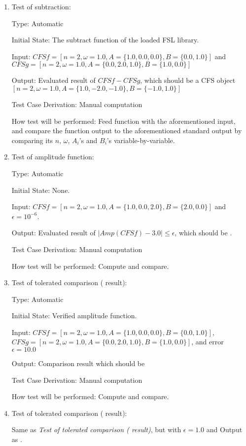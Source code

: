 \documentclass[12pt, titlepage]{article}
\begin{document}
\begin{enumerate}
	
	\item{Test of subtraction: \\}
	
	Type: Automatic
	
	Initial State: The subtract function of the loaded FSL library.
	
	Input: $\mathit{CFSf}=[n=2, \omega=1.0, A=\{1.0, 0.0, 0.0\}, B=\{0.0, 1.0\}]$ and 
	$\mathit{CFSg}=[n=2, \omega=1.0, A=\{0.0, 2.0, 1.0\}, B=\{1.0, 0.0\}]$	 
	
	Output: Evaluated result of $\mathit{CFSf}-\mathit{CFSg}$, which should
        be a CFS object
        $[n=2, \omega=1.0, A=\{1.0, -2.0, -1.0\}, B=\{-1.0, 1.0\}]$
	
	Test Case Derivation: Manual computation
	
	How test will be performed: Feed function with the aforementioned input,
        and compare the function output to the aforementioned standard output by
        comparing its $n$, $\omega$, $A_i$'s and $B_i$'s variable-by-variable.
	
	\item{Test of amplitude function: \\}					
	
	Type: Automatic
	
	Initial State: None.
	
	Input: $\mathit{CFSf}=[n=2, \omega=1.0, A=\{1.0, 0.0, 2.0\}, B=\{2.0, 0.0\}]$ and $\epsilon=10^{-6}$.
	
	Output: Evaluated result of $|\mathit{Amp}(\mathit{CFSf})-3.0|\leq\epsilon$, which should be .
	
	Test Case Derivation: Manual computation
	
	How test will be performed: Compute and compare.
	
	
	\item{Test of tolerated comparison  ( result): \\}
	
	Type: Automatic
	
	Initial State: Verified amplitude function.
	
	Input: $\mathit{CFSf}=[n=2, \omega=1.0, A=\{1.0, 0.0, 0.0\}, B=\{0.0, 1.0\}]$, 
	$\mathit{CFSg}=[n=2, \omega=1.0, A=\{0.0, 2.0, 1.0\}, B=\{1.0, 0.0\}]$, and error $\epsilon=10.0$
	
	Output: Comparison result which should be 
	
	Test Case Derivation: Manual computation
	
	How test will be performed: Compute and compare.
	
	\item{Test of tolerated comparison  ( result):\\}
	
	Same as \textit{Test of tolerated comparison  ( result)}, but with $\epsilon=1.0$ and Output as .    
\end{enumerate}
\end{document}
